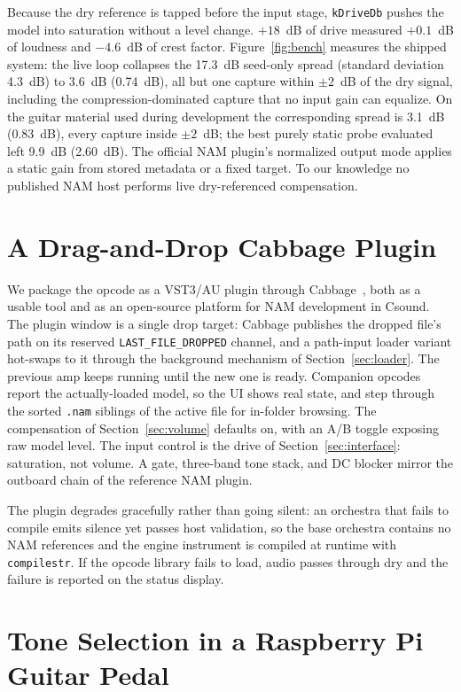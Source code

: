 \documentclass[runningheads,a4paper]{llncs}
\begin{document}
Because the dry reference is tapped before the input stage,
\texttt{kDriveDb} pushes the model into saturation without a level change.
$+18$~dB of drive measured $+0.1$~dB of loudness and $-4.6$~dB of crest
factor. Figure~\ref{fig:bench} measures the shipped system: the live loop
collapses the 17.3~dB seed-only spread (standard deviation 4.3~dB) to
3.6~dB (0.74~dB), all but one capture within $\pm 2$~dB of the dry
signal, including the compression-dominated capture that no input
gain can equalize. On the guitar material used during development the
corresponding spread is 3.1~dB (0.83~dB), every capture inside
$\pm 2$~dB; the best purely static probe evaluated left 9.9~dB
(2.60~dB). The official NAM plugin's normalized
output mode applies a static gain from stored metadata or a fixed target.
To our knowledge no published NAM host performs live dry-referenced
compensation.

\section{A Drag-and-Drop Cabbage Plugin}
\label{sec:plugin}

We package the opcode as a VST3/AU plugin through
Cabbage~\cite{walsh2011cabbage}, both as a usable tool and as an
open-source platform for NAM development in Csound. The plugin window is a single drop target: Cabbage publishes the
dropped file's path on its reserved \texttt{LAST\_FILE\_DROPPED}
channel, and a path-input loader variant hot-swaps to it through the
background mechanism of Section~\ref{sec:loader}. The previous amp keeps running until the new one
is ready. Companion opcodes report the actually-loaded model, so
the UI shows real state, and step through the sorted \texttt{.nam}
siblings of the active file for in-folder browsing. The compensation of Section~\ref{sec:volume} defaults on, with an A/B
toggle exposing raw model level. The input control is the drive of
Section~\ref{sec:interface}: saturation, not volume. A gate, three-band tone stack,
and DC blocker mirror the outboard chain of the reference NAM plugin.

The plugin degrades gracefully rather than going silent: an orchestra
that fails to compile emits silence yet passes host validation, so the
base orchestra contains no NAM references and the engine instrument is
compiled at runtime with \texttt{compilestr}. If
the opcode library fails to load, audio passes through dry and the failure
is reported on the status display.

\section{Tone Selection in a Raspberry Pi Guitar Pedal}
\label{sec:pedal}
\end{document}
